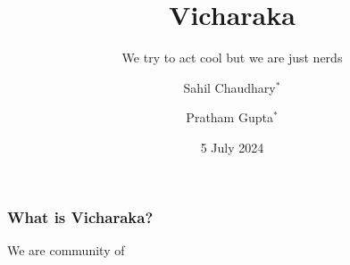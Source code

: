 \documentclass{beamer}
\title[Vicharaka]
{Vicharaka}
\subtitle{We try to act cool but we are just nerds}
\author[Chaudhary, Gupta]
{
    Sahil Chaudhary$^*$ \and Pratham Gupta$^*$
}
\institute[]
{Indian Institute of Science}
\date[5 July 2024]
{5 July 2024}
\begin{document}
\frame{\titlepage}

\begin{frame}
    \frametitle{What is Vicharaka?}
    We are community of 
\end{frame}
\end{document}
